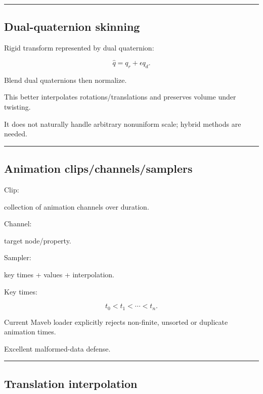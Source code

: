 \begin{center}\rule{0.5\linewidth}{0.5pt}\end{center}

\subsection{Dual-quaternion skinning}\label{04-visual-computing-ii-ch041-dual-quaternion-skinning}

\hypertarget{04-visual-computing-ii-ch041-dual-quaternion-skinning}{}

Rigid transform represented by dual quaternion:

\[
\hat q=
q_r+
\epsilon q_d.
\]

Blend dual quaternions then normalize.

This better interpolates rotations/translations and preserves volume under twisting.

It does not naturally handle arbitrary nonuniform scale; hybrid methods are needed.

\begin{center}\rule{0.5\linewidth}{0.5pt}\end{center}

\subsection{Animation clips/channels/samplers}\label{04-visual-computing-ii-ch041-animation-clipschannelssamplers}

\hypertarget{04-visual-computing-ii-ch041-animation-clipschannelssamplers}{}

Clip:

collection of animation channels over duration.

Channel:

target node/property.

Sampler:

key times + values + interpolation.

Key times:

\[
t_0<t_1<\cdots<t_n.
\]

Current Maveb loader explicitly rejects non-finite, unsorted or duplicate animation times.

Excellent malformed-data defense.

\begin{center}\rule{0.5\linewidth}{0.5pt}\end{center}

\subsection{Translation interpolation}\label{04-visual-computing-ii-ch041-translation-interpolation}

